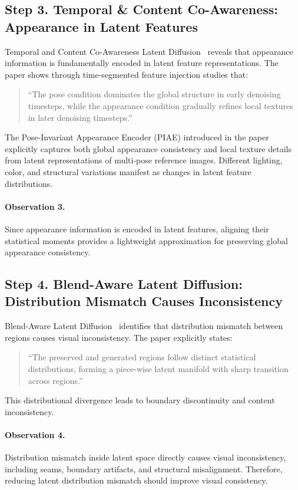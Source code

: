 \documentclass[12pt]{article}
\begin{document}
\subsection{Step 3. Temporal \& Content Co-Awareness: Appearance in Latent Features}

Temporal and Content Co-Awareness Latent Diffusion~\cite{HaoCVPR2026} reveals that appearance information is fundamentally encoded in latent feature representations. The paper shows through time-segmented feature injection studies that:

\begin{quote}
``The pose condition dominates the global structure in early denoising timesteps, while the appearance condition gradually refines local textures in later denoising timesteps.''
\end{quote}

The Pose-Invariant Appearance Encoder (PIAE) introduced in the paper explicitly captures both global appearance consistency and local texture details from latent representations of multi-pose reference images. Different lighting, color, and structural variations manifest as changes in latent feature distributions.

\paragraph{Observation 3.}
Since appearance information is encoded in latent features, aligning their statistical moments provides a lightweight approximation for preserving global appearance consistency.

\subsection{Step 4. Blend-Aware Latent Diffusion: Distribution Mismatch Causes Inconsistency}

Blend-Aware Latent Diffusion~\cite{LiuCVPR2026} identifies that distribution mismatch between regions causes visual inconsistency. The paper explicitly states:

\begin{quote}
``The preserved and generated regions follow distinct statistical distributions, forming a piece-wise latent manifold with sharp transition across regions.''
\end{quote}

This distributional divergence leads to boundary discontinuity and content inconsistency.

\paragraph{Observation 4.}
Distribution mismatch inside latent space directly causes visual inconsistency, including seams, boundary artifacts, and structural misalignment. Therefore, reducing latent distribution mismatch should improve visual consistency.
\end{document}

